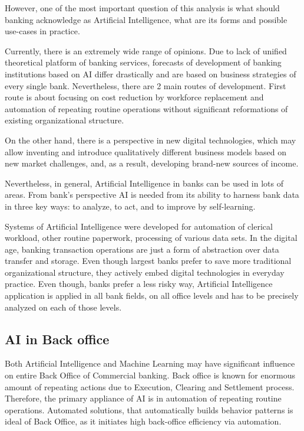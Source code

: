 However, one of the most important question of this analysis is what should banking acknowledge as Artificial Intelligence, what are its forms and possible use-cases in practice.

Currently, there is an extremely wide range of opinions.
Due to lack of unified theoretical platform of banking services, forecasts of development of banking institutions based on AI differ drastically and are based on business strategies of every single bank.
Nevertheless, there are 2 main routes of development.
First route is about focusing on cost reduction by workforce replacement and automation of repeating routine operations without significant reformations of existing organizational structure.

On the other hand, there is a perspective in new digital technologies, which may allow inventing and introduce qualitatively different business models based on new market challenges, and, as a result, developing brand-new sources of income.
\cite{ai_reality_hype}

Nevertheless, in general, Artificial Intelligence in banks can be used in lots of areas.
From bank's perspective AI is needed from its ability to harness bank data in three key ways: to analyze, to act, and to improve by self-learning.

Systems of Artificial Intelligence were developed for automation of clerical workload, other routine paperwork, processing of various data sets.
In the digital age, banking transaction operations are just a form of abstraction over data transfer and storage.
Even though largest banks prefer to save more traditional organizational structure, they actively embed digital technologies in everyday practice.
Even though, banks prefer a less risky way, Artificial Intelligence application is applied in all bank fields, on all office levels and has to be precisely analyzed on each of those levels.



\subsection{AI in Back office}

Both Artificial Intelligence and Machine Learning may have significant influence on entire Back Office of Commercial banking.
Back office is known for enormous amount of repeating actions due to Execution, Clearing and Settlement process.
Therefore, the primary appliance of AI is in automation of repeating routine operations.
Automated solutions, that automatically builds behavior patterns is ideal of Back Office, as it initiates high back-office efficiency via automation.

